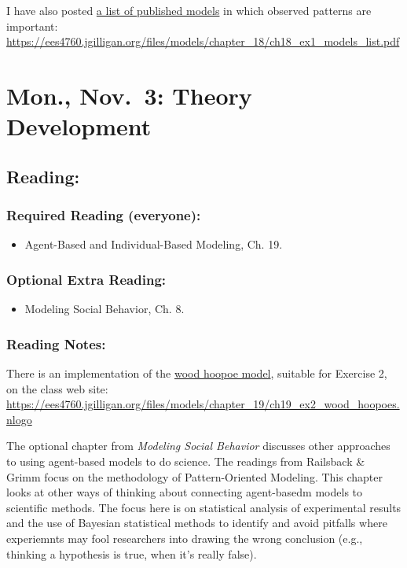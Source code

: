 \documentclass[
]{article}
\providecommand{\tightlist}{%
  \setlength{\itemsep}{0pt}\setlength{\parskip}{0pt}}
\begin{document}
I have also posted
\href{/files/models/chapter_18/ch18_ex1_models_list.pdf}{a list of
published models} in which observed patterns are important:
\url{https://ees4760.jgilligan.org/files/models/chapter_18/ch18_ex1_models_list.pdf}

\section{Mon., Nov.~3: Theory
Development}\label{mon.-nov.-3-theory-development}

\subsection{Reading:}\label{reading-20}

\subsubsection{Required Reading
(everyone):}\label{required-reading-everyone-17}

\begin{itemize}
\tightlist
\item
  Agent-Based and Individual-Based Modeling, Ch. 19.
\end{itemize}

\subsubsection{Optional Extra Reading:}\label{optional-extra-reading-4}

\begin{itemize}
\tightlist
\item
  Modeling Social Behavior, Ch. 8.
\end{itemize}

\subsubsection{Reading Notes:}\label{reading-notes-15}

There is an implementation of the
\href{/files/models/chapter_19/ch19_ex2_wood_hoopoes.nlogo}{wood hoopoe
model}, suitable for Exercise 2, on the class web site:
\url{https://ees4760.jgilligan.org/files/models/chapter_19/ch19_ex2_wood_hoopoes.nlogo}

The optional chapter from \emph{Modeling Social Behavior} discusses
other approaches to using agent-based models to do science. The readings
from Railsback \& Grimm focus on the methodology of Pattern-Oriented
Modeling. This chapter looks at other ways of thinking about connecting
agent-basedm models to scientific methods. The focus here is on
statistical analysis of experimental results and the use of Bayesian
statistical methods to identify and avoid pitfalls where experiemnts may
fool researchers into drawing the wrong conclusion (e.g., thinking a
hypothesis is true, when it's really false).
\end{document}
